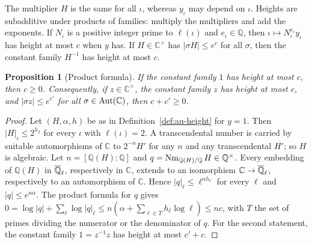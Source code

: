 \documentclass[10pt]{amsart}
\newtheorem{proposition}[theorem]{Proposition}
\theoremstyle{definition}
\theoremstyle{remark}
\newcommand{\C}{\mathbb C}
\newcommand{\Q}{\mathbb Q}
\begin{document}
The multiplier $H$ is the same for all $\iota$, whereas $y_\iota$ may depend on $\iota$. Heights
are subadditive under products of families: multiply the multipliers and add the exponents. If
$N_\iota$ is a positive integer prime to $\ell(\iota)$ and $e_\iota\in\Q$, then
$\iota\mapsto N_\iota^{e_\iota}y_\iota$ has height at most $c$ when $y$ has. If $H\in\C^\times$
has $|\sigma H|\le e^{c}$ for all $\sigma$, then the constant family $H^{-1}$ has height at most
$c$.

\begin{proposition}[Product formula]\label{au:product}
If the constant family $1$ has height at most $c$, then $c\ge0$. Consequently, if $z\in\C^\times$,
the constant family $z$ has height at most $c$, and $|\sigma z|\le e^{c'}$ for all
$\sigma\in\auAut(\C)$, then $c+c'\ge0$.
\end{proposition}
\begin{proof}
Let $(H,\alpha,h)$ be as in Definition~\ref{def:au-height} for $y=1$. Then
$|H|_\iota\le2^{h_2}$ for every $\iota$ with $\ell(\iota)=2$. A transcendental number is carried
by suitable automorphisms of $\C$ to $2^{-n}H'$ for any $n$ and any transcendental $H'$; so $H$ is
algebraic. Let $n=[\Q(H):\Q]$ and $q=\auNm_{\Q(H)/\Q}H\in\Q^\times$. Every embedding of $\Q(H)$
in $\auQlb$, respectively in $\C$, extends to an isomorphism $\C\to\auQlb$, respectively to an
automorphism of $\C$. Hence $|q|_\ell\le\ell^{nh_\ell}$ for every $\ell$ and $|q|\le e^{n\alpha}$.
The product formula for $q$ gives $0=\log|q|+\sum_\ell\log|q|_\ell\le n(\alpha+\sum_{\ell\in T}
h_\ell\log\ell)\le nc$, with $T$ the set of primes dividing the numerator or the denominator of
$q$. For the second statement, the constant family $1=z^{-1}z$ has height at most $c'+c$.
\end{proof}
\end{document}
